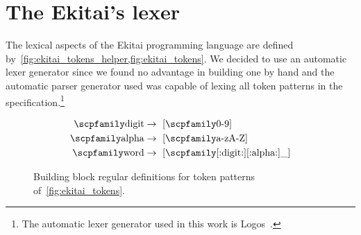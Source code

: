 \documentclass[
  oneside,
  english,
  coorientadorbanca,
  noabntexcite
]{ufsc-thesis-rn46-2019}
\newcommand{\code}[1]{\text{\scpfamily\setlength\spaceskip{0.35em}#1}}
\begin{document}
\section{The Ekitai's lexer}

The lexical aspects of the Ekitai programming language are defined by~\cref{fig:ekitai_tokens_helper,fig:ekitai_tokens}.
We decided to use an automatic lexer generator since we found no advantage in building one by hand and the automatic parser generator used was capable of lexing all token patterns in the specification.\footnote{The automatic lexer generator used in this work is Logos~\cite{logos2020}.}

\begin{figure}[ht]
  \small
  \begin{align*}
    \code{digit} & \rightarrow \ [\code{0-9}]                  \\
    \code{alpha} & \rightarrow \ [\code{a-zA-Z}]               \\
    \code{word}  & \rightarrow \ [\code{[:digit:][:alpha:]\_}]
  \end{align*}
  \caption{
    Building block regular definitions for token patterns of~\cref{fig:ekitai_tokens}.
  }\label{fig:ekitai_tokens_helper}
\end{figure}
\end{document}
